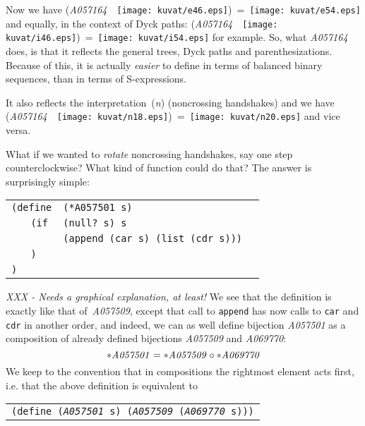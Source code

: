 \documentclass[11pt]{article} %
\newcommand{\eeq}{\end{equation}}
\newcommand{\beql}[1]{\begin{equation}\label{#1}}
\newcommand{\catint}[1]{({\it #1})}
\newcommand{\autname}[1]{{\it *#1}}
\newcommand{\scmsym}[1]{{\tt{#1}}}
\newcommand{\scmcode}[1]{{\tt{#1}}}
\newenvironment{scmdefinefun5}{\begin{tabular}{l l l l p{5cm}}}{\end{tabular}}
\newcommand{\scmexmcomment}[1]{[\emph{#1}]}
\newcommand{\nilatom}{\ensuremath{\mathbf{(~)}}\xspace}
\newcommand{\funapply}{\ensuremath{\circ}}
\begin{document}
Now we have (\autname{A057164}~~\texttt{[image: kuvat/e46.eps]})~=~\texttt{[image: kuvat/e54.eps]}
and equally, in the context of Dyck paths: \newline
(\autname{A057164}~~\texttt{[image: kuvat/i46.eps]})~=~\texttt{[image: kuvat/i54.eps]} for example. So, what \autname{A057164} does,
is that it reflects the general trees, Dyck paths and parenthesizations.
Because of this, it is actually \emph{easier} to define in terms
of balanced binary sequences, than in terms of S-expressions.

It also reflects the interpretation~\catint{n} (noncrossing handshakes) and
we have (\autname{A057164}~~\texttt{[image: kuvat/n18.eps]})~=~\texttt{[image: kuvat/n20.eps]} and vice versa.

What if we wanted to \emph{rotate} noncrossing handshakes, say one step
counterclockwise? What kind of function could do that?
The answer is surprisingly simple:

\begin{scmdefinefun5}
\multicolumn{2}{l}{\scmcode{(define}} & \multicolumn{2}{l}{\scmcode{(*A057501 s)}}\\
 & \scmcode{(if} & \multicolumn{2}{l}{\scmcode{(null? s) s}}
 & \\ %
 &               & \multicolumn{2}{l}{\scmcode{(append (car s) (list (cdr s)))}}
& \\ %
& \scmcode{)}\\
\scmcode{)}\\
\end{scmdefinefun5}

\emph{XXX - Needs a graphical explanation, at least!}
We see that the definition is exactly like that of~\autname{A057509},
except that call to \scmsym{append} has now calls to \scmsym{car} and
\scmsym{cdr} in another order, and indeed, we can as well define
bijection \autname{A057501} as a composition of already defined bijections
\autname{A057509} and \autname{A069770}:
\beql{A057501_as_A057509_o_A069770}
\autname{A057501} = \autname{A057509}\funapply\autname{A069770}
\eeq
We keep to the convention that in compositions the rightmost element acts
first, i.e. that the above definition is equivalent to
\begin{center}
\begin{tabular}{l}
\scmcode{(define (\autname{A057501}~s)~(\autname{A057509}~(\autname{A069770}~s)))}
\end{tabular}
\end{center}
\end{document}
